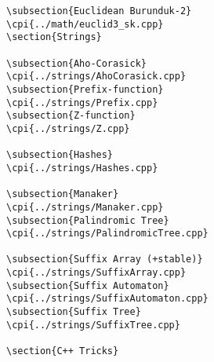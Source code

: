 {\begin{verbatim}
\subsection{Euclidean Burunduk-2}
\cpi{../math/euclid3_sk.cpp}
\section{Strings}

\subsection{Aho-Corasick}
\cpi{../strings/AhoCorasick.cpp}
\subsection{Prefix-function}
\cpi{../strings/Prefix.cpp}
\subsection{Z-function}
\cpi{../strings/Z.cpp}

\subsection{Hashes}
\cpi{../strings/Hashes.cpp}

\subsection{Manaker}
\cpi{../strings/Manaker.cpp}
\subsection{Palindromic Tree}
\cpi{../strings/PalindromicTree.cpp}

\subsection{Suffix Array (+stable)}
\cpi{../strings/SuffixArray.cpp}
\subsection{Suffix Automaton}
\cpi{../strings/SuffixAutomaton.cpp}
\subsection{Suffix Tree}
\cpi{../strings/SuffixTree.cpp}

\section{C++ Tricks}

\end{verbatim}}
